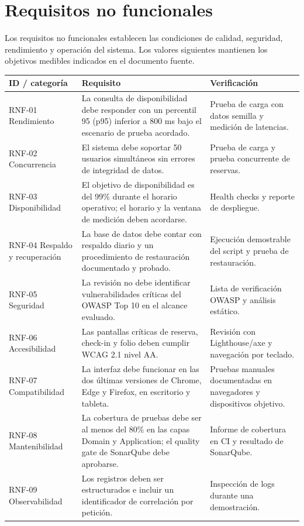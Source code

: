 \documentclass[12pt,a4paper]{article}
\begin{document}
\section{Requisitos no funcionales}

Los requisitos no funcionales establecen las condiciones de calidad, seguridad, rendimiento y operación del sistema. Los valores siguientes mantienen los objetivos medibles indicados en el documento fuente.

\begin{longtable}{p{2.5cm} p{7.3cm} p{3.6cm}}
\toprule
\textbf{ID / categoría} & \textbf{Requisito} & \textbf{Verificación}\\
\midrule
RNF-01 Rendimiento & La consulta de disponibilidad debe responder con un percentil 95 (p95) inferior a 800 ms bajo el escenario de prueba acordado. & Prueba de carga con datos semilla y medición de latencias.\\
RNF-02 Concurrencia & El sistema debe soportar 50 usuarios simultáneos sin errores de integridad de datos. & Prueba de carga y prueba concurrente de reservas.\\
RNF-03 Disponibilidad & El objetivo de disponibilidad es del 99\% durante el horario operativo; el horario y la ventana de medición deben acordarse. & Health checks y reporte de despliegue.\\
RNF-04 Respaldo y recuperación & La base de datos debe contar con respaldo diario y un procedimiento de restauración documentado y probado. & Ejecución demostrable del script y prueba de restauración.\\
RNF-05 Seguridad & La revisión no debe identificar vulnerabilidades críticas del OWASP Top 10 en el alcance evaluado. & Lista de verificación OWASP y análisis estático.\\
RNF-06 Accesibilidad & Las pantallas críticas de reserva, check-in y folio deben cumplir WCAG 2.1 nivel AA. & Revisión con Lighthouse/axe y navegación por teclado.\\
RNF-07 Compatibilidad & La interfaz debe funcionar en las dos últimas versiones de Chrome, Edge y Firefox, en escritorio y tableta. & Pruebas manuales documentadas en navegadores y dispositivos objetivo.\\
RNF-08 Mantenibilidad & La cobertura de pruebas debe ser al menos del 80\% en las capas Domain y Application; el quality gate de SonarQube debe aprobarse. & Informe de cobertura en CI y resultado de SonarQube.\\
RNF-09 Observabilidad & Los registros deben ser estructurados e incluir un identificador de correlación por petición. & Inspección de logs durante una demostración.\\

\end{longtable}
\end{document}
